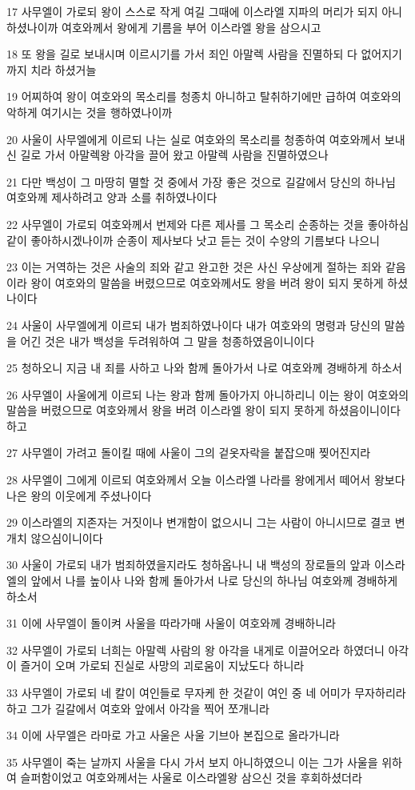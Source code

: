 \par 17 사무엘이 가로되 왕이 스스로 작게 여길 그때에 이스라엘 지파의 머리가 되지 아니하셨나이까 여호와께서 왕에게 기름을 부어 이스라엘 왕을 삼으시고
\par 18 또 왕을 길로 보내시며 이르시기를 가서 죄인 아말렉 사람을 진멸하되 다 없어지기까지 치라 하셨거늘
\par 19 어찌하여 왕이 여호와의 목소리를 청종치 아니하고 탈취하기에만 급하여 여호와의 악하게 여기시는 것을 행하였나이까
\par 20 사울이 사무엘에게 이르되 나는 실로 여호와의 목소리를 청종하여 여호와께서 보내신 길로 가서 아말렉왕 아각을 끌어 왔고 아말렉 사람을 진멸하였으나
\par 21 다만 백성이 그 마땅히 멸할 것 중에서 가장 좋은 것으로 길갈에서 당신의 하나님 여호와께 제사하려고 양과 소를 취하였나이다
\par 22 사무엘이 가로되 여호와께서 번제와 다른 제사를 그 목소리 순종하는 것을 좋아하심 같이 좋아하시겠나이까 순종이 제사보다 낫고 듣는 것이 수양의 기름보다 나으니
\par 23 이는 거역하는 것은 사술의 죄와 같고 완고한 것은 사신 우상에게 절하는 죄와 같음이라 왕이 여호와의 말씀을 버렸으므로 여호와께서도 왕을 버려 왕이 되지 못하게 하셨나이다
\par 24 사울이 사무엘에게 이르되 내가 범죄하였나이다 내가 여호와의 명령과 당신의 말씀을 어긴 것은 내가 백성을 두려워하여 그 말을 청종하였음이니이다
\par 25 청하오니 지금 내 죄를 사하고 나와 함께 돌아가서 나로 여호와께 경배하게 하소서
\par 26 사무엘이 사울에게 이르되 나는 왕과 함께 돌아가지 아니하리니 이는 왕이 여호와의 말씀을 버렸으므로 여호와께서 왕을 버려 이스라엘 왕이 되지 못하게 하셨음이니이다 하고
\par 27 사무엘이 가려고 돌이킬 때에 사울이 그의 겉옷자락을 붙잡으매 찢어진지라
\par 28 사무엘이 그에게 이르되 여호와께서 오늘 이스라엘 나라를 왕에게서 떼어서 왕보다 나은 왕의 이웃에게 주셨나이다
\par 29 이스라엘의 지존자는 거짓이나 변개함이 없으시니 그는 사람이 아니시므로 결코 변개치 않으심이니이다
\par 30 사울이 가로되 내가 범죄하였을지라도 청하옵나니 내 백성의 장로들의 앞과 이스라엘의 앞에서 나를 높이사 나와 함께 돌아가서 나로 당신의 하나님 여호와께 경배하게 하소서
\par 31 이에 사무엘이 돌이켜 사울을 따라가매 사울이 여호와께 경배하니라
\par 32 사무엘이 가로되 너희는 아말렉 사람의 왕 아각을 내게로 이끌어오라 하였더니 아각이 즐거이 오며 가로되 진실로 사망의 괴로움이 지났도다 하니라
\par 33 사무엘이 가로되 네 칼이 여인들로 무자케 한 것같이 여인 중 네 어미가 무자하리라 하고 그가 길갈에서 여호와 앞에서 아각을 찍어 쪼개니라
\par 34 이에 사무엘은 라마로 가고 사울은 사울 기브아 본집으로 올라가니라
\par 35 사무엘이 죽는 날까지 사울을 다시 가서 보지 아니하였으니 이는 그가 사울을 위하여 슬퍼함이었고 여호와께서는 사울로 이스라엘왕 삼으신 것을 후회하셨더라

